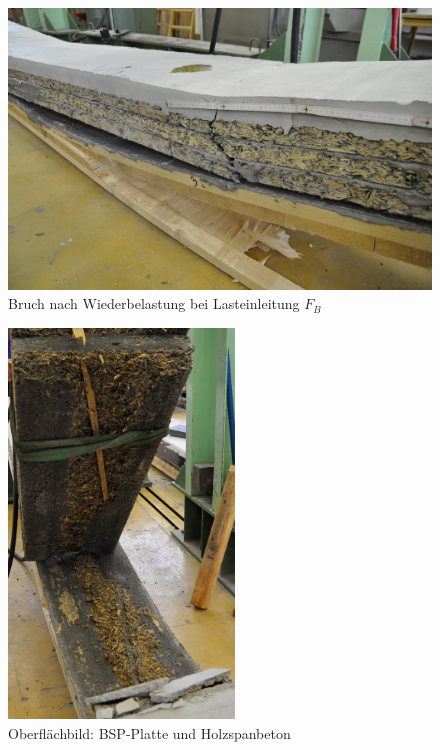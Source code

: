 \begin{figure}
\begin{center}
	\includegraphics[scale=0.1]{Auswertung/3versuch/bruch_3versuch.jpg}
	\caption{Bruch nach Wiederbelastung bei Lasteinleitung $F_B$  }
	\label{bruch_3versuch}
\end{center}
\end{figure}




\begin{figure}
\begin{center}
	\includegraphics[width=6cm]{Auswertung/3versuch/fugenbruch_3versuch.jpg}
	\caption{Oberflächbild: BSP-Platte und Holzspanbeton}
	\label{fugenbruch_3versuch}
\end{center}
\end{figure}

